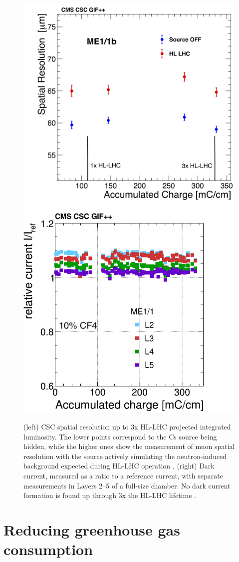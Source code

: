 \documentclass[a4paper,11pt]{article}
\begin{document}
\begin{figure}[htbp]
\centering %
\includegraphics[width=.45\textwidth]{GIF_Resol_vs_Q_11b_pnt_first_4p_tdrSt_HLLHC.png}
\qquad
\includegraphics[width=.46\textwidth]{ME11_relI.png}
\caption{\label{fig:PerformanceHLLHC} (left) CSC spatial resolution up to 3x HL-LHC projected integrated luminosity. The lower points correspond to the Cs source being hidden, while the higher ones show the measurement of muon spatial resolution with the source actively simulating the neutron-induced background expected during HL-LHC operation \cite{hfo}. (right) Dark current, measured as a ratio to a reference current, with separate measurements in Layers 2--5 of a full-size chamber. No dark current formation is found up through 3x the HL-LHC lifetime \cite{highlights}.}
\end{figure}

\section{Reducing greenhouse gas consumption}
\label{sec:ghg}
\end{document}
